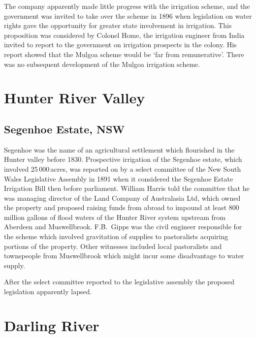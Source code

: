 The company apparently made little progress with the irrigation
sch\-eme, and the government was invited to take over the scheme in
1896 when legislation on water rights gave the opportunity for greater
state involvement in irrigation.  This proposition was considered by
Colonel Home, the irrigation engineer from India invited to report to
the government on irrigation prospects in the colony.  His report
showed that the Mulgoa scheme would be `far from remunerative'.  There
was no subsequent development of the Mulgoa irrigation scheme.

\section*{Hunter River Valley}

\subsection*{Segenhoe Estate, NSW}

Segenhoe was the name of an agricultural settlement which flourished
in the Hunter valley before 1830.  Prospective irrigation of the
Segenhoe estate, which involved 25\,000\,acres, was reported on by a
select committee of the New South Wales Legislative Assembly in 1891
when it considered the Segenhoe Estate Irrigation Bill then before
parliament.  William Harris told the committee that he was managing
director of the Land Company of Australasia Ltd, which owned the
property and proposed raising funds from abroad to impound at least
800 million gallons of flood waters of the Hunter River system
upstream from Aberdeen and Muswellbrook.  F.\.B.~Gipps was the civil
engineer responsible for the scheme which involved gravitation of
supplies to pastoralists acquiring portions of the property.  Other
witnesses included local pastoralists and townspeople from
Muswellbrook which might incur some disadvantage to water supply.

After the select committee reported to the legislative assembly the
proposed legislation apparently lapsed.

\section*{Darling River}

